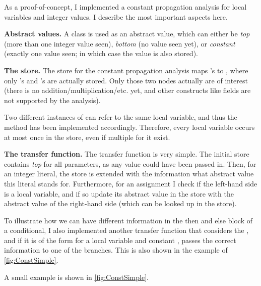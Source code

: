 \begin{workinprogress}
    As a proof-of-concept, I implemented a constant propagation analysis for local variables
    and integer values. I describe the most important aspects here.
    
    \textbf{Abstract values.} A class  is used as an abstract value, which can
    either be \emph{top} (more than one integer value seen), \emph{bottom} (no value seen yet),
    or \emph{constant} (exactly one value seen; in which case the value is also stored).
    
    \textbf{The store.} The store for the constant propagation analysis maps 's to ,
    where only 's and 's are actually stored. Only those
    two nodes actually are of interest (there is no addition/multiplication/etc. yet, and other constructs like
    fields are not supported by the analysis).
    
    Two different instances of  can refer to the same local variable, and thus
    the  method has been implemented accordingly. Therefore, every local variable occurs
    at most once in the store, even if multiple  for it exist.
    
    \textbf{The transfer function.} The transfer function is very simple. The initial store contains
    \emph{top} for all parameters, as any value could have been passed in. Then, for
    an integer literal, the store is extended with the information what abstract value this literal
    stands for. Furthermore, for an assignment I check if the left-hand side is
    a local variable, and if so update its abstract value in the
    store with the abstract value of the right-hand side (which can be looked up in the store).
    
    To illustrate how we can have different information in the then and else block of a conditional,
    I also implemented another transfer function that considers the , and if
    it is of the form  for a local variable  and constant , passes
    the correct information to one of the branches. This is also shown in the example of \autoref{fig:ConstSimple}.
    
     A small example is shown in \autoref{fig:ConstSimple}.
\end{workinprogress}




